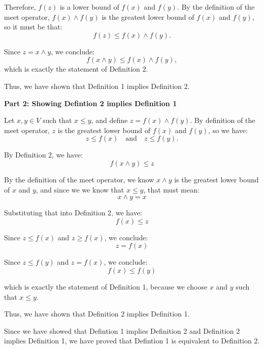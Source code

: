 \documentclass[12pt]{article}
\begin{document}
\begin{enumerate}
\begin{mdframed}
          Therefore, $f(z)$ is a lower bound of $f(x)$ and $f(y)$. By the definition of the meet operator, $f(x) \wedge f(y)$ is the greatest lower bound of $f(x)$ and $f(y)$, so it must be that:
          \[
          f(z) \leq f(x) \wedge f(y).
          \]

          Since $z = x \wedge y$, we conclude:
          \[
          f(x \wedge y) \leq f(x) \wedge f(y),
          \]
          which is exactly the statement of Definition 2.

          \medskip

          Thus, we have shown that Definition 1 implies Definition 2.

          \medskip

          \textbf{Part 2: Showing Defintion 2 implies Definition 1}

          Let $x, y \in V$ such that $x \leq y$, and define $z = f(x) \wedge f(y)$. By definition of the meet operator, $z$ is the greatest lower bound of $f(x)$ and $f(y)$, so we have:
          \[
          z \leq f(x) \quad \text{and} \quad z \leq f(y).
          \]

          By Definition 2, we have:
          \[
          f(x \wedge y) \leq z
          \]

          By the definition of the meet operator, we know $x \wedge y$ is the greatest lower bound of $x$ and $y$, and since we we know that $x \leq y$, that must mean:
          \[
          x \wedge y = x
          \]

          Substituting that into Definition 2, we have:
          \[
          f(x) \leq z
          \]

          Since $z \leq f(x)$ and $z \geq f(x)$, we conclude:
          \[
          z = f(x)
          \]

          Since $z \leq f(y)$ and $z = f(x)$, we conclude:
          \[
          f(x) \leq f(y)
          \]

          which is exactly the statement of Definition 1, because we choose $x$ and $y$ such that $x \leq y$.

          Thus, we have shown that Definition 2 implies Definition 1.

          \medskip

          Since we have showed that Defintion 1 implies Definition 2 and Definition 2 implies Definition 1, we have proved that Defintion 1 is equivalent to Definition 2.
        \end{mdframed}


\end{enumerate}
\end{document}
